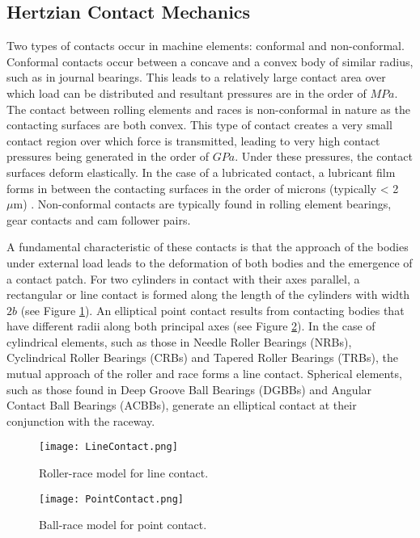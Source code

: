 \subsection{Hertzian Contact Mechanics}

Two types of contacts occur in machine elements: conformal and non-conformal. Conformal contacts occur between a concave and a convex body of similar radius, such as in journal bearings. This leads to a relatively large contact area over which load can be distributed and resultant pressures are in the order of $MPa$. The contact between rolling elements and races is non-conformal in nature as the contacting surfaces are both convex. This type of contact creates a very small contact region over which force is transmitted, leading to very high contact pressures being generated in the order of $GPa$. Under these pressures, the contact surfaces deform elastically. In the case of a lubricated contact, a lubricant film forms in between the contacting surfaces in the order of microns (typically < 2~$\mu \mathrm{m}$) \cite{Gohar2018}. Non-conformal contacts are typically found in rolling element bearings, gear contacts and cam follower pairs.

A fundamental characteristic of these contacts is that the approach of the bodies under external load leads to the deformation of both bodies and the emergence of a contact patch. For two cylinders in contact with their axes parallel, a rectangular or line contact is formed along the length of the cylinders with width $2b$ (see Figure \ref{LineContact}). An elliptical point contact results from contacting bodies that have different radii along both principal axes \cite{Johnson1985} (see Figure \ref{PointContact}). In the case of cylindrical elements, such as those in Needle Roller Bearings (NRBs), Cyclindrical Roller Bearings (CRBs) and Tapered Roller Bearings (TRBs), the mutual approach of the roller and race forms a line contact. Spherical elements, such as those found in Deep Groove Ball Bearings (DGBBs) and Angular Contact Ball Bearings (ACBBs), generate an elliptical contact at their conjunction with the raceway.

\begin{figure}
	\centerline{\texttt{[image: LineContact.png]}}
	\caption[Roller-race model for line contact.]{Roller-race model for line contact. \cite{Zaretsky2016}}
	\label{LineContact}
\end{figure}

\begin{figure}
	\centerline{\texttt{[image: PointContact.png]}}
	\caption[Ball-race model for point contact.]{Ball-race model for point contact. \cite{Zaretsky2016}}
	\label{PointContact}
\end{figure}

